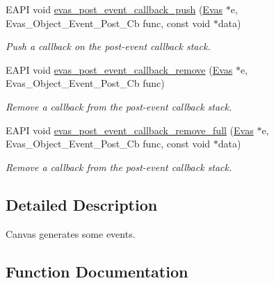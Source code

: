 \begin{DoxyCompactItemize}
EAPI void \hyperlink{group__Evas__Canvas__Events_ga8f8a2686dbbe3c55e091decf3f29d42a}{evas\_\-post\_\-event\_\-callback\_\-push} (\hyperlink{group__Evas__Canvas_ga5ff87cc4ce6bc43e3b640a6d37f73043}{Evas} $\ast$e, Evas\_\-Object\_\-Event\_\-Post\_\-Cb func, const void $\ast$data)
\begin{DoxyCompactList}\small\item\em Push a callback on the post-\/event callback stack. \item\end{DoxyCompactList}\item 
EAPI void \hyperlink{group__Evas__Canvas__Events_ga59f159113fe24fdb5e33e7df3e333516}{evas\_\-post\_\-event\_\-callback\_\-remove} (\hyperlink{group__Evas__Canvas_ga5ff87cc4ce6bc43e3b640a6d37f73043}{Evas} $\ast$e, Evas\_\-Object\_\-Event\_\-Post\_\-Cb func)
\begin{DoxyCompactList}\small\item\em Remove a callback from the post-\/event callback stack. \item\end{DoxyCompactList}\item 
EAPI void \hyperlink{group__Evas__Canvas__Events_ga3c76c419125c3cad9095f1fdae5f3ac9}{evas\_\-post\_\-event\_\-callback\_\-remove\_\-full} (\hyperlink{group__Evas__Canvas_ga5ff87cc4ce6bc43e3b640a6d37f73043}{Evas} $\ast$e, Evas\_\-Object\_\-Event\_\-Post\_\-Cb func, const void $\ast$data)
\begin{DoxyCompactList}\small\item\em Remove a callback from the post-\/event callback stack. \item\end{DoxyCompactList}\end{DoxyCompactItemize}


\subsection{Detailed Description}
Canvas generates some events. 

\subsection{Function Documentation}
